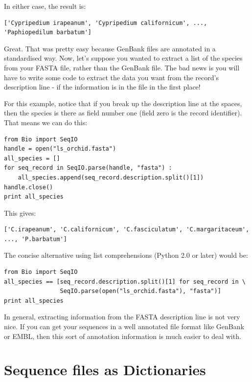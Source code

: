 \documentclass{report}
\begin{document}
\noindent In either case, the result is:

\begin{verbatim}
['Cypripedium irapeanum', 'Cypripedium californicum', ..., 'Paphiopedilum barbatum']
\end{verbatim} 

Great.  That was pretty easy because GenBank files are annotated in a standardised way.  Now, let's suppose you wanted to extract a list of the species from your FASTA file, rather than the GenBank file.  The bad news is you will have to write some code to extract the data you want from the record's description line - if the information is in the file in the first place!

For this example, notice that if you break up the description line at the spaces, then the species is there as field number one (field zero is the record identifier).  That means we can do this:

\begin{verbatim}
from Bio import SeqIO
handle = open("ls_orchid.fasta")
all_species = []
for seq_record in SeqIO.parse(handle, "fasta") :
    all_species.append(seq_record.description.split()[1])
handle.close()
print all_species
\end{verbatim}

\noindent This gives:

\begin{verbatim}
['C.irapeanum', 'C.californicum', 'C.fasciculatum', 'C.margaritaceum', ..., 'P.barbatum']
\end{verbatim}

The concise alternative using list comprehensions (Python 2.0 or later) would be:

\begin{verbatim}
from Bio import SeqIO
all_species == [seq_record.description.split()[1] for seq_record in \
                SeqIO.parse(open("ls_orchid.fasta"), "fasta")]
print all_species
\end{verbatim}

In general, extracting information from the FASTA description line is not very nice.  If you can get your sequences in a well annotated file format like GenBank or EMBL, then this sort of annotation information is much easier to deal with.

\section{Sequence files as Dictionaries}
\end{document}
